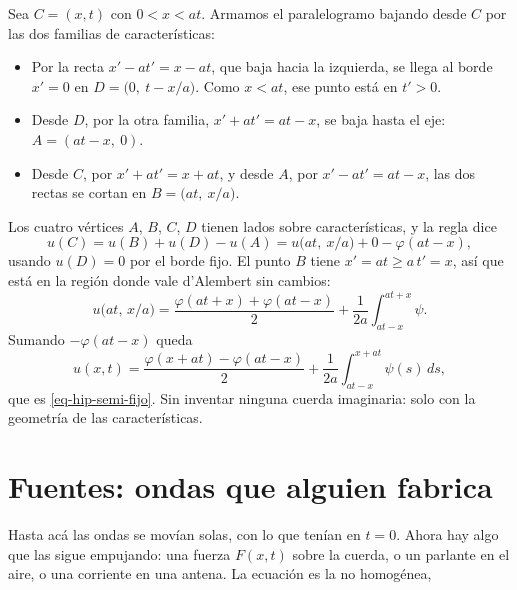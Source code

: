 \documentclass[
  spanish,
  a4paper,
]{scrbook}
\providecommand{\tightlist}{%
  \setlength{\itemsep}{0pt}\setlength{\parskip}{0pt}}
\theoremstyle{definition}
\theoremstyle{plain}
\theoremstyle{definition}
\theoremstyle{plain}
\theoremstyle{definition}
\theoremstyle{remark}
\begin{document}
\begin{tcolorbox}[enhanced jigsaw, arc=.35mm, bottomrule=.15mm, bottomtitle=1mm, breakable, colback=white, colbacktitle=quarto-callout-tip-color!10!white, colframe=quarto-callout-tip-color-frame, coltitle=black, left=2mm, leftrule=.75mm, opacityback=0, opacitybacktitle=0.6, rightrule=.15mm, title=\textcolor{quarto-callout-tip-color}{\faLightbulb}\hspace{0.5em}{Solución}, titlerule=0mm, toprule=.15mm, toptitle=1mm]

Sea \(C = (x,t)\) con \(0<x<at\). Armamos el paralelogramo bajando desde
\(C\) por las dos familias de características:

\begin{itemize}
\tightlist
\item
  Por la recta \(x' - at' = x - at\), que baja hacia la izquierda, se
  llega al borde \(x'=0\) en \(D = \big(0,\ t - x/a\big)\). Como
  \(x<at\), ese punto está en \(t'>0\).
\item
  Desde \(D\), por la otra familia, \(x' + at' = at - x\), se baja hasta
  el eje: \(A = (at - x,\ 0)\).
\item
  Desde \(C\), por \(x' + at' = x + at\), y desde \(A\), por
  \(x' - at' = at - x\), las dos rectas se cortan en
  \(B = \big(at,\ x/a\big)\).
\end{itemize}

Los cuatro vértices \(A\), \(B\), \(C\), \(D\) tienen lados sobre
características, y la regla dice \[
u(C) = u(B) + u(D) - u(A) = u\big(at,\ x/a\big) + 0 - \varphi(at-x),
\] usando \(u(D) = 0\) por el borde fijo. El punto \(B\) tiene
\(x' = at \ge a\,t' = x\), así que está en la región donde vale
d'Alembert sin cambios: \[
u\big(at,\,x/a\big) = \frac{\varphi(at + x) + \varphi(at - x)}{2} + \frac{1}{2a}\int_{at-x}^{at+x}\psi .
\] Sumando \(-\varphi(at-x)\) queda \[
u(x,t) = \frac{\varphi(x+at) - \varphi(at-x)}{2} + \frac{1}{2a}\int_{at-x}^{x+at}\psi(s)\,ds ,
\] que es \ref{eq-hip-semi-fijo}. Sin inventar ninguna cuerda
imaginaria: solo con la geometría de las características.

\end{tcolorbox}

\section{Fuentes: ondas que alguien fabrica}\label{sec-hip-fuentes}

Hasta acá las ondas se movían solas, con lo que tenían en \(t=0\). Ahora
hay algo que las sigue empujando: una fuerza \(F(x,t)\) sobre la cuerda,
o un parlante en el aire, o una corriente en una antena. La ecuación es
la no homogénea,
\end{document}
